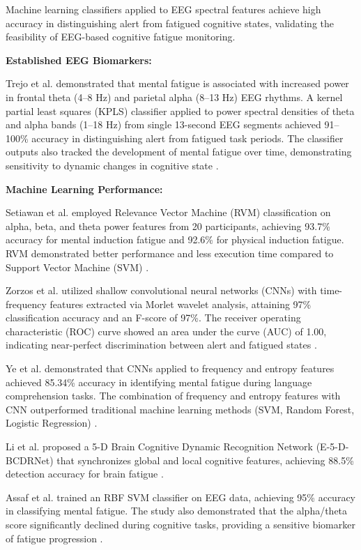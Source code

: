 \documentclass[journal,twoside,10pt]{IEEEtran}
\begin{document}
Machine learning classifiers applied to EEG spectral features achieve high accuracy in distinguishing alert from fatigued cognitive states, validating the feasibility of EEG-based cognitive fatigue monitoring.

\textbf{Established EEG Biomarkers:}

Trejo et al. \cite{ref1,ref4} demonstrated that mental fatigue is associated with increased power in frontal theta (4--8 Hz) and parietal alpha (8--13 Hz) EEG rhythms. A kernel partial least squares (KPLS) classifier applied to power spectral densities of theta and alpha bands (1--18 Hz) from single 13-second EEG segments achieved 91--100\% accuracy in distinguishing alert from fatigued task periods. The classifier outputs also tracked the development of mental fatigue over time, demonstrating sensitivity to dynamic changes in cognitive state \cite{ref1,ref4}.

\textbf{Machine Learning Performance:}

Setiawan et al. \cite{ref9} employed Relevance Vector Machine (RVM) classification on alpha, beta, and theta power features from 20 participants, achieving 93.7\% accuracy for mental induction fatigue and 92.6\% for physical induction fatigue. RVM demonstrated better performance and less execution time compared to Support Vector Machine (SVM) \cite{ref9}.

Zorzos et al. \cite{ref10} utilized shallow convolutional neural networks (CNNs) with time-frequency features extracted via Morlet wavelet analysis, attaining 97\% classification accuracy and an F-score of 97\%. The receiver operating characteristic (ROC) curve showed an area under the curve (AUC) of 1.00, indicating near-perfect discrimination between alert and fatigued states \cite{ref10}.

Ye et al. \cite{ref14} demonstrated that CNNs applied to frequency and entropy features achieved 85.34\% accuracy in identifying mental fatigue during language comprehension tasks. The combination of frequency and entropy features with CNN outperformed traditional machine learning methods (SVM, Random Forest, Logistic Regression) \cite{ref14}.

Li et al. \cite{ref24} proposed a 5-D Brain Cognitive Dynamic Recognition Network (E-5-D-BCDRNet) that synchronizes global and local cognitive features, achieving 88.5\% detection accuracy for brain fatigue \cite{ref24}.

Assaf et al. \cite{ref6,ref15} trained an RBF SVM classifier on EEG data, achieving 95\% accuracy in classifying mental fatigue. The study also demonstrated that the alpha/theta score significantly declined during cognitive tasks, providing a sensitive biomarker of fatigue progression \cite{ref6,ref15}.
\end{document}
